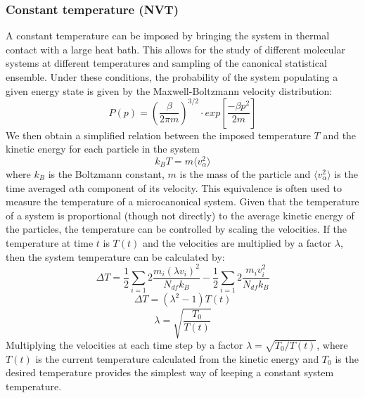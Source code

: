 \subsubsection{Constant temperature (NVT)}
A constant temperature can be imposed by bringing the system in thermal contact with a large heat bath. This allows for the study of different molecular systems at different temperatures and sampling of the canonical statistical ensemble. Under these conditions, the probability of the system populating a given energy state is given by the Maxwell-Boltzmann velocity distribution:
%
%
\begin{equation}
P(p)=\left( \frac{\beta}{2\pi m} \right) ^{3/2}\cdot exp \left[ \frac{-\beta p^{2}}{2m} \right]
\end{equation}
%
%
We then obtain a simplified relation between the imposed temperature $T$ and the kinetic energy for each particle in the system
%
%
\begin{equation}
k_{B}T=m\langle v^{2}_{\alpha} \rangle
\end{equation}
%
%
where $k_{B}$ is the Boltzmann constant, $m$ is the mass of the particle and $\langle v^{2}_{\alpha} \rangle$ is the time averaged $\alpha$th component of its velocity. This equivalence is often used to measure the temperature of a microcanonical system. Given that the temperature of a system is proportional (though not directly) to the average kinetic energy of the particles, the temperature can be controlled by scaling the velocities. If the temperature at time $t$ is $T(t)$ and the velocities are multiplied by a factor $\lambda$, then the system temperature can be calculated by:
%
%
\begin{equation}
\Delta T=\frac{1}{2} \sum_{i=1} 2\frac{m_{i}(\lambda v_{i})^{2}}{N_{df}k_{B}} - \frac{1}{2} \sum_{i=1} 2\frac{m_{i} v_{i}^{2}}{N_{df}k_{B}}
\end{equation}
%
%
\begin{equation}
\Delta T = (\lambda^{2} -1) T(t)
\end{equation}   
%
%
\begin{equation}
\lambda = \sqrt{\frac{T_{0}}{T(t)}}
\end{equation}
%
%
Multiplying the velocities at each time step by a factor $ \lambda = \sqrt{T_{0}/T(t)} $, where $T(t)$ is the current temperature calculated from the kinetic energy and $T_{0}$ is the desired temperature provides the simplest way of keeping a constant system temperature.
%
%
\\\\
